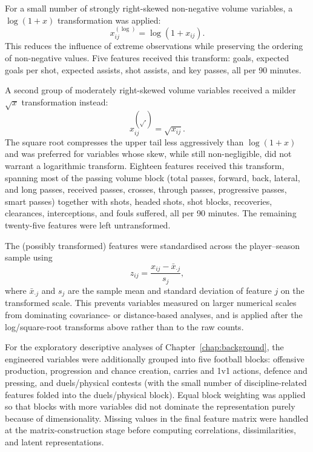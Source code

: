 \begin{definition}
For a small number of strongly right-skewed non-negative volume variables, a \(\log(1+x)\) transformation was applied:
\[
x^{(\log)}_{ij}=\log(1+x_{ij}).
\]
This reduces the influence of extreme observations while preserving the ordering of non-negative values. Five features received this transform: goals, expected goals per shot, expected assists, shot assists, and key passes, all per 90 minutes.
\end{definition}

\begin{definition}
A second group of moderately right-skewed volume variables received a milder \(\sqrt{x}\) transformation instead:
\[
x^{(\sqrt{\ })}_{ij}=\sqrt{x_{ij}}.
\]
The square root compresses the upper tail less aggressively than \(\log(1+x)\) and was preferred for variables whose skew, while still non-negligible, did not warrant a logarithmic transform. Eighteen features received this transform, spanning most of the passing volume block (total passes, forward, back, lateral, and long passes, received passes, crosses, through passes, progressive passes, smart passes) together with shots, headed shots, shot blocks, recoveries, clearances, interceptions, and fouls suffered, all per 90 minutes. The remaining twenty-five features were left untransformed.
\end{definition}

\begin{definition}[Standardisation]
The (possibly transformed) features were standardised across the player--season sample using
\[
z_{ij}=\frac{x_{ij}-\bar{x}_{\cdot j}}{s_j},
\]
where \(\bar{x}_{\cdot j}\) and \(s_j\) are the sample mean and standard deviation of feature \(j\) on the transformed scale. This prevents variables measured on larger numerical scales from dominating covariance- or distance-based analyses, and is applied after the log/square-root transforms above rather than to the raw counts.
\end{definition}

For the exploratory descriptive analyses of Chapter~\ref{chap:background}, the engineered variables were additionally grouped into five football blocks: offensive production, progression and chance creation, carries and 1v1 actions, defence and pressing, and duels/physical contests (with the small number of discipline-related features folded into the duels/physical block). Equal block weighting was applied so that blocks with more variables did not dominate the representation purely because of dimensionality. Missing values in the final feature matrix were handled at the matrix-construction stage before computing correlations, dissimilarities, and latent representations.

